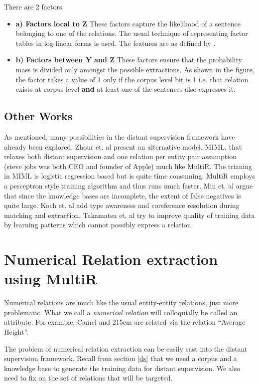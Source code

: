 \documentclass[a4paper,10pt]{article}
\begin{document}
There are 2 factors:
\begin{itemize}
\item \textbf{a) Factors local to Z} These factors capture the likelihood of a sentence belonging to one of the relations.
The usual technique of representing factor tables in log-linear forms is used. The features are as defined by 
\cite{mintz}.

\item \textbf{b) Factors between Y and Z} These factors ensure that the probability mass is divided only amongst the possible extractions.
As shown in the figure, the factor takes a value of 1 only if the corpus level bit is 1 i.e. that relation exists at corpus level \textbf{and} 
at least one of the sentences also expresses it.
\end{itemize}
  
\subsection{Other Works}
As mentioned, many possibilities in the distant supervision framework have already been explored.
Zhour et. al \cite{zhou2012multi} present an alternative model, MIML, that relaxes both distant supervision 
and one relation per entity pair assumption (steve jobs was both CEO and founder of Apple) much like MultiR. The trianing in MIML is logistic regression
based but is quite time consuming. MultiR employs a perceptron style training algorithm and thus runs much faster.
Min et. al \cite{min2013distant} argue that since the knowledge bases are incomplete, the extent of false negatives is quite large. 
Koch et. al \cite{soderlandtype} add type awareness and coreference resolution during matching and extraction.
Takamatsu et. al \cite{takamatsu2012reducing} try to improve quality of training data by learning patterns which cannot possibly express a relation.

\section{Numerical Relation extraction using MultiR}
Numerical relations are much like the usual entity-entity relations, just more problematic.
What we call a \emph{numerical relation} will colloquially be called an attribute. 
For example, Camel and 215cm are related via the relation ``Average Height''.

The problem of numerical relation extraction can be easily cast into the distant supervision framework.
Recall from section \ref{ds} that we need a corpus and a knowledge base to generate the training data for distant supervision.
We also need to fix on the set of relations that will be targeted. 
\end{document}
